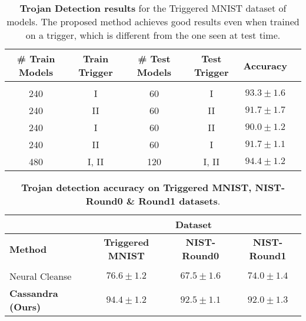 \documentclass{article}
\begin{document}
\begin{table}[h!]
	\centering
	\caption{\textbf{Trojan Detection results} for the Triggered MNIST dataset of models. The proposed method achieves good results even when trained on a trigger, which is  different  from the one seen at test time.}
	\footnotesize


		\begin{tabular}{|c|c|c|c|c|c|}
 		\hline
\# \textbf{Train Models}  & \textbf{Train Trigger} & \# \textbf{Test Models}  & \textbf{Test Trigger} & \textbf{Accuracy} \\
\hline \\[-1em] \hline
 240  & I     & 60  & I     & $93.3\pm1.6$ \\
        \hline
 240  & II    & 60  & II    & $91.7\pm1.7$ \\
        \hline
  240  & I     & 60  & II    & $90.0\pm1.2$ \\
        \hline
  240  & II    & 60  & I     & $91.7\pm1.1$ \\
        \hline
  480  & I, II & 120 & I, II & $94.4\pm1.2$ \\
  \hline
\hline
		\end{tabular}
\label{table:model-table7}
\end{table}

\begin{table}[b!]
\caption{\textbf{Trojan detection accuracy on Triggered MNIST, NIST-Round0 \& Round1 datasets}.}
\begin{center}
\label{tab:comaprison_f}
\begin{tabular}{|l|c|c|c|}
\hline
 & \multicolumn{3}{c|}{\textbf{Dataset}} \\
\hline
\textbf{Method} & \textbf{Triggered MNIST} & \textbf{NIST-Round0}  &\textbf{NIST-Round1} \\ \hline
\\[-1em] \hline
Neural Cleanse~\cite{wang2019neural}& $76.6\pm1.2$  &$67.5\pm1.6$  & $74.0\pm1.4$  \\ \hline
\textbf{Cassandra (Ours)} & $94.4\pm1.2$ & $92.5\pm1.1$ & $92.0\pm1.3$ \\
\hline

\end{tabular}
\end{center}
\end{table}
\end{document}
